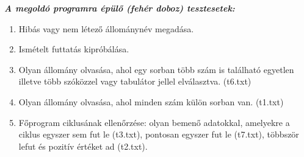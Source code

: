 \documentclass[12pt]{report}
\begin{document}
\textit{\textbf{A megoldó programra épülő (fehér doboz) tesztesetek:}}
\begin{enumerate}[noitemsep]
  \item Hibás vagy nem létező állománynév megadása.
  \item Ismételt futtatás kipróbálása.
  \item Olyan állomány olvasása, ahol egy sorban több szám is található egyetlen illetve több szóközzel vagy tabulátor jellel elválasztva. (t6.txt)
  \item Olyan állomány olvasása, ahol minden szám külön sorban van. (t1.txt)
  \item Főprogram ciklusának ellenőrzése: olyan bemenő adatokkal, amelyekre a ciklus egyszer sem fut le (t3.txt), pontosan egyszer fut le (t7.txt), többször lefut és pozitív értéket ad (t2.txt).
\end{enumerate}
\end{document}
